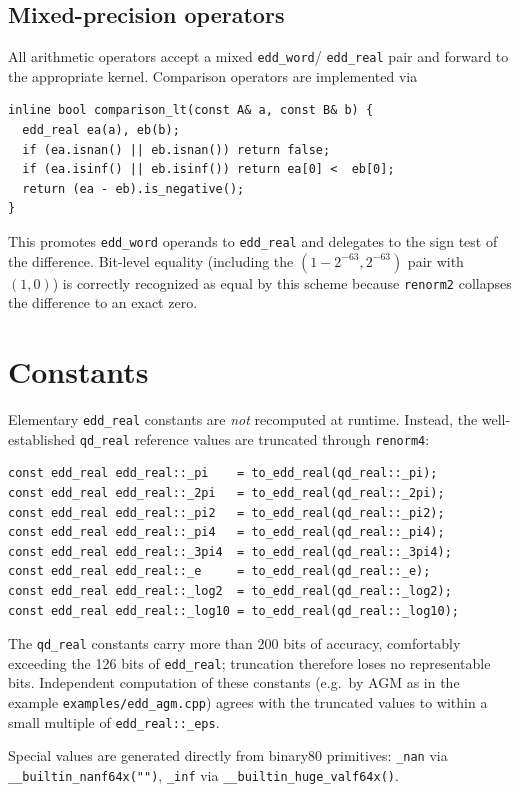 \documentclass[11pt,a4paper]{article}
\begin{document}
\subsection{Mixed-precision operators}

All arithmetic operators accept a mixed \texttt{edd\_word}/%
\texttt{edd\_real} pair and forward to the appropriate kernel.
Comparison operators are implemented via
\begin{lstlisting}
inline bool comparison_lt(const A& a, const B& b) {
  edd_real ea(a), eb(b);
  if (ea.isnan() || eb.isnan()) return false;
  if (ea.isinf() || eb.isinf()) return ea[0] <  eb[0];
  return (ea - eb).is_negative();
}
\end{lstlisting}
This promotes \texttt{edd\_word} operands to \texttt{edd\_real}
and delegates to the sign test of the difference.  Bit-level
equality (including the $(1 - 2^{-63}, 2^{-63})$ pair with
$(1, 0)$) is correctly recognized as equal by this scheme because
\texttt{renorm2} collapses the difference to an exact zero.

\section{Constants}
\label{sec:const}

Elementary \texttt{edd\_real} constants are \emph{not} recomputed
at runtime.  Instead, the well-established \texttt{qd\_real}
reference values are truncated through \texttt{renorm4}:
\begin{lstlisting}
const edd_real edd_real::_pi    = to_edd_real(qd_real::_pi);
const edd_real edd_real::_2pi   = to_edd_real(qd_real::_2pi);
const edd_real edd_real::_pi2   = to_edd_real(qd_real::_pi2);
const edd_real edd_real::_pi4   = to_edd_real(qd_real::_pi4);
const edd_real edd_real::_3pi4  = to_edd_real(qd_real::_3pi4);
const edd_real edd_real::_e     = to_edd_real(qd_real::_e);
const edd_real edd_real::_log2  = to_edd_real(qd_real::_log2);
const edd_real edd_real::_log10 = to_edd_real(qd_real::_log10);
\end{lstlisting}
The \texttt{qd\_real} constants carry more than 200 bits of
accuracy, comfortably exceeding the 126 bits of
\texttt{edd\_real}; truncation therefore loses no
representable bits.  Independent computation of these constants
(e.g.\ by AGM as in the example \texttt{examples/edd\_agm.cpp})
agrees with the truncated values to within a small multiple of
\texttt{edd\_real::\_eps}.

Special values are generated directly from binary80 primitives:
\texttt{\_nan} via \verb|__builtin_nanf64x("")|, \texttt{\_inf}
via \verb|__builtin_huge_valf64x()|.
\end{document}

